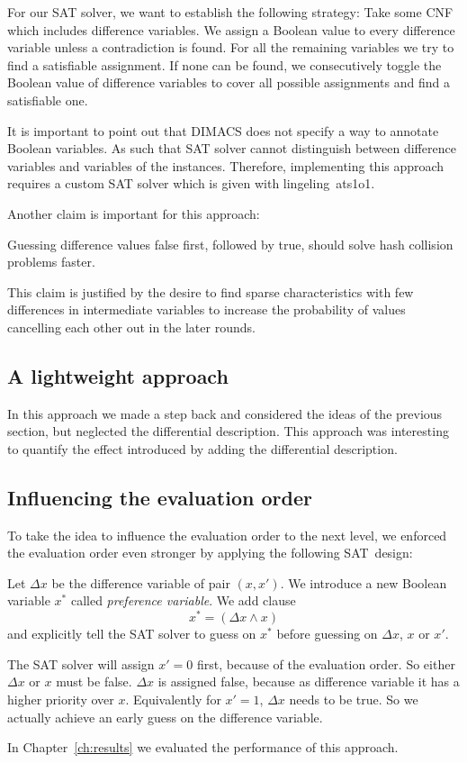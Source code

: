 For our SAT solver, we want to establish the following strategy:
Take some CNF which includes difference variables. We assign a Boolean value
to every difference variable unless a contradiction is found. For all the
remaining variables we try to find a satisfiable assignment. If none can be found,
we consecutively toggle the Boolean value of difference variables to cover all
possible assignments and find a satisfiable one. 

It is important to point out that DIMACS does not specify a way to annotate Boolean
variables. As such that SAT solver cannot distinguish between difference variables
and variables of the instances. Therefore, implementing this approach requires a custom
SAT solver which is given with lingeling~ats1o1.

Another claim is important for this approach:

\begin{prop}
  \label{prop:false-first}
  Guessing difference values false first, followed by true,
  should solve hash collision problems faster.
\end{prop}

This claim is justified by the desire to find sparse characteristics with few differences
in intermediate variables to increase the probability of values cancelling each other out
in the later rounds.

\subsection{A lightweight approach}
\label{sec:enc-lightweight}
%
In this approach we made a step back and considered the ideas of the previous
section, but neglected the differential description. This approach was interesting
to quantify the effect introduced by adding the differential description.

\subsection{Influencing the evaluation order}
\label{sec:enc-diff-desc-eo}
%
To take the idea to influence the evaluation order to the next level,
we enforced the evaluation order even stronger by applying the following SAT~design:

Let $\Delta x$ be the difference variable of pair $(x, x')$. We introduce a new Boolean
variable $x^*$ called \emph{preference variable}. We add clause
\[ x^* = (\Delta x \land x) \]
and explicitly tell the SAT solver to guess on $x^*$ before guessing on $\Delta x$, $x$ or $x'$.

The SAT solver will assign $x'=0$ first, because of the evaluation order. So either $\Delta x$
or $x$ must be false. $\Delta x$ is assigned false, because as difference variable it has a higher
priority over $x$. Equivalently for $x'=1$, $\Delta x$ needs to be true. So we actually
achieve an early guess on the difference variable.

In Chapter~\ref{ch:results} we evaluated the performance of this approach.
